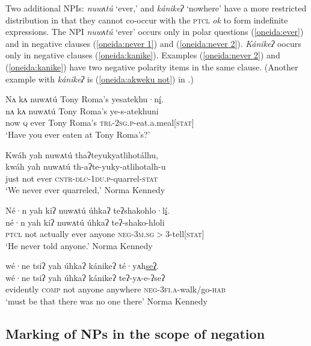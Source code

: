 \documentclass[output=paper,colorlinks,citecolor=brown]{langscibook}
\begin{document}
Two additional NPIs: \textit{nuwʌtú} `ever,' and \textit{kánikeʔ} `nowhere' have a more restricted distribution in that they cannot co-occur with the \textsc{ptcl} \textit{ok} to form indefinite expressions. The NPI \textit{nuwʌtú} `ever' occurs only in polar questions (\ref{oneida:ever}) and in negative clauses (\ref{oneida:never 1}) and (\ref{oneida:never 2}). \textit{Kánikeʔ} oocurs only in negative clauses (\ref{oneida:kanike}). Examples (\ref{oneida:never 2}) and (\ref{oneida:kanike}) have two negative polarity items in the same clause. (Another example with \textit{kánikeʔ} is (\ref{oneida:akweku not}) in .)

\ea\label{oneida:ever}
    \glll Nʌ kʌ nuwʌtú Tony Roma's yesatekhu·n\uline{í}. \\
    nʌ kʌ nuwʌtú Tony Roma’s ye-s-atekhuni \\
     now \textsc{q} ever Tony Roma's \textsc{trl-2sg.p}-eat.a.meal[\textsc{stat}] \\
    \glt `Have you ever eaten at Tony Roma’s?' 
\z

\ea\label{oneida:never 1}	
    \glll Kwáh yah nuwʌtú thaʔteyukyatlihotálhu, \\
    kwáh yah nuwʌtú th-aʔte-yuky-atlihotalh-u \\
     just not ever \textsc{cntr-dlc-1du.p}-quarrel-\textsc{stat} \\ 
    \glt `We never ever quarreled,' Norma Kennedy \citep[147 (8)]{MichelsonEtAl2016}
\z

\ea\label{oneida:never 2}
    \glll Né·n yah kiʔ nuwʌtú úhkaʔ teʔshakohlo·l\uline{í}. \\
    né·n yah kiʔ nuwʌtú úhkaʔ teʔ-shako-hloli \\
    \textsc{ptcl} not actually ever anyone \textsc{neg-3m.sg$>$3}-tell[\textsc{stat}]  \\
    \glt `He never told anyone.' Norma Kennedy \citep[78 (48)]{MichelsonEtAl2016}
\z

\ea\label{oneida:kanike}
    \glll wé·ne tsiʔ yah úhkaʔ kánikeʔ té·yʌh\uline{seʔ}. \\
    wé·ne tsiʔ yah úhkaʔ kánikeʔ teʔ-yʌ-e-ʔseʔ \\
      evidently \textsc{comp} not anyone anywhere \textsc{neg-3fi.a}-walk/go-\textsc{hab}  \\
    \glt `must be that there was no one there' Norma Kennedy \citep[77 (33)]{MichelsonEtAl2016}
\z

\subsection{Marking of NPs in the scope of negation}
\label{oneida:sec:NP}
\end{document}
